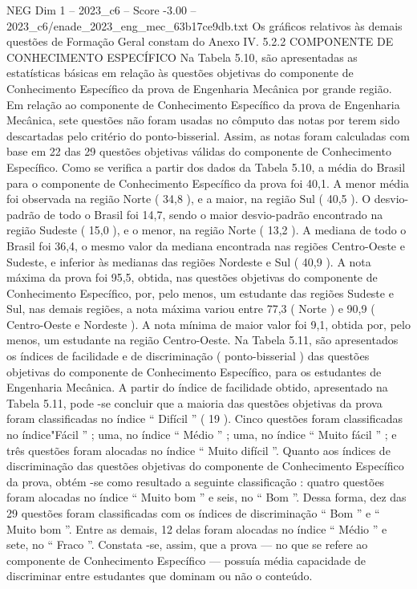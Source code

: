 \begin{textsample}{NEG Dim 1 – 2023\_c6 – Score -3.00 – 2023\_c6/enade\_2023\_eng\_mec\_63b17ce9db.txt}
Os gráficos relativos às demais questões de Formação Geral constam do Anexo IV. 5.2.2 COMPONENTE DE CONHECIMENTO ESPECÍFICO Na Tabela 5.10, são apresentadas as estatísticas básicas em relação às questões objetivas do componente de Conhecimento Específico da prova de Engenharia Mecânica por grande região.
Em relação ao componente de Conhecimento Específico da prova de Engenharia Mecânica, sete questões não foram usadas no cômputo das notas por terem sido descartadas pelo critério do ponto-bisserial.
Assim, as notas foram calculadas com base em 22 das 29 questões objetivas válidas do componente de Conhecimento Específico.
Como se verifica a partir dos dados da Tabela 5.10, a média do Brasil para o componente de Conhecimento Específico da prova foi 40,1.
A menor média foi observada na região Norte ( 34,8 ), e a maior, na região Sul ( 40,5 ).
O desvio-padrão de todo o Brasil foi 14,7, sendo o maior desvio-padrão encontrado na região Sudeste ( 15,0 ), e o menor, na região Norte ( 13,2 ).
A mediana de todo o Brasil foi 36,4, o mesmo valor da mediana encontrada nas regiões Centro-Oeste e Sudeste, e inferior às medianas das regiões Nordeste e Sul ( 40,9 ).
A nota máxima da prova foi 95,5, obtida, nas questões objetivas do componente de Conhecimento Específico, por, pelo menos, um estudante das regiões Sudeste e Sul, nas demais regiões, a nota máxima variou entre 77,3 ( Norte ) e 90,9 ( Centro-Oeste e Nordeste ).
A nota mínima de maior valor foi 9,1, obtida por, pelo menos, um estudante na região Centro-Oeste.
Na Tabela 5.11, são apresentados os índices de facilidade e de discriminação ( ponto-bisserial ) das questões objetivas do componente de Conhecimento Específico, para os estudantes de Engenharia Mecânica.
A partir do índice de facilidade obtido, apresentado na Tabela 5.11, pode -se concluir que a maioria das questões objetivas da prova foram classificadas no índice “ Difícil ” ( 19 ).
Cinco questões foram classificadas no índice"Fácil ” ; uma, no índice “ Médio ” ; uma, no índice “ Muito fácil ” ; e três questões foram alocadas no índice “ Muito difícil ”.
Quanto aos índices de discriminação das questões objetivas do componente de Conhecimento Específico da prova, obtém -se como resultado a seguinte classificação : quatro questões foram alocadas no índice “ Muito bom ” e seis, no “ Bom ”.
Dessa forma, dez das 29 questões foram classificadas com os índices de discriminação “ Bom ” e “ Muito bom ”.
Entre as demais, 12 delas foram alocadas no índice “ Médio ” e sete, no “ Fraco ”.
Constata -se, assim, que a prova — no que se refere ao componente de Conhecimento Específico — possuía média capacidade de discriminar entre estudantes que dominam ou não o conteúdo.

\end{textsample}
